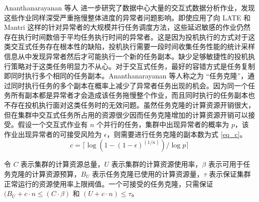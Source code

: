 Ananthanarayanan 等人 \cite{180304} 进一步研究了数据中心大量的交互式数据分析作业，发现这些作业同样深受严重拖慢整体进度的异常者问题影响。即使应用了向 LATE \cite{Zaharia:2008:IMP:1855741.1855744} 和 Mantri \cite{Ananthanarayanan:2010:ROM:1924943.1924962} 这样的针对异常者的大规模并行任务调度方法，这些延迟敏感的作业仍然存在执行时间数倍于平均任务执行时间的异常者。这是因为投机执行的方式对于这类交互式任务存在根本性的缺陷，投机执行需要一段时间收集任务性能的统计采样信息从中发现异常者然后才可能执行一个新的任务副本。缺少足够敏捷性的投机执行策略对于这类任务明显力不从心。对于交互式任务，最好的容错方式是任务复制即同时执行多个相同的任务副本。Ananthanarayanan 等人称之为 ``任务克隆''，通过同时执行任务的多个副本在概率上减少了异常者任务出现的机会。因为同一个任务所有副本都是异常者才会造成该任务拖慢整个作业，而且同时执行的任务副本也不存在投机执行面对这类任务时的无效问题。虽然任务克隆的计算资源开销很大，但在集群中交互式任务所占用的资源很少因而任务克隆增加的计算资源开销可以接受。假设一个交互式作业有 $n$ 个并行的任务，集群中出现异常者的概率为 $p$，该作业出现异常者的可接受风险为 $\epsilon$，则需要进行任务克隆的副本数为式 \eqref{eq_c}。
\begin{equation}\label{eq_c}
c = \lceil \log(1-(1-\epsilon)^{(1/n)})/\log p \rceil
\end{equation}

令 $C$ 表示集群的计算资源总量，$U$ 表示集群的计算资源使用率，$\beta$ 表示可用于任务克隆的计算资源预算，$B_U$ 表示任务克隆已使用的计算资源量，$\tau$ 表示保证集群正常运行的资源使用率上限阀值。一个可接受的任务克隆，只需保证 $(B_U + c \cdot n \leq (C \cdot \beta)$ 和 $(U + c \cdot n) \leq \tau$。

